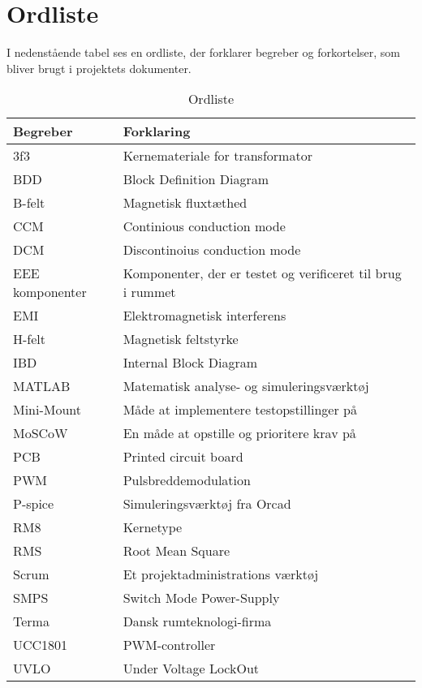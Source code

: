 \section{Ordliste}
I nedenstående tabel ses en ordliste, der forklarer begreber og forkortelser, som bliver brugt i projektets dokumenter.
\begin{table}[H] 			
	\centering
	\begin{tabularx}{\textwidth}{|X|l|} 
		\hline
		\textbf{Begreber} & \textbf{Forklaring} \\ \hline
		3f3 & Kernemateriale for transformator \\ \hline
		BDD & Block Definition Diagram \\ \hline
		B-felt & Magnetisk fluxtæthed \\ \hline
		CCM & Continious conduction mode \\ \hline
		DCM & Discontinoius conduction mode \\ \hline
		EEE komponenter & Komponenter, der er testet og verificeret til brug i rummet \\ \hline
		EMI & Elektromagnetisk interferens \\ \hline
		H-felt & Magnetisk feltstyrke \\ \hline
		IBD & Internal Block Diagram \\ \hline
		MATLAB & Matematisk analyse- og simuleringsværktøj \\ \hline
		Mini-Mount & Måde at implementere testopstillinger på \\ \hline
		MoSCoW & En måde at opstille og prioritere krav på \\ \hline
		PCB & Printed circuit board \\ \hline
		PWM & Pulsbreddemodulation \\ \hline
		P-spice & Simuleringsværktøj fra Orcad \\ \hline
		RM8 & Kernetype \\ \hline
		RMS & Root Mean Square \\ \hline
		Scrum & Et projektadministrations værktøj \\ \hline
		SMPS & Switch Mode Power-Supply \\ \hline
		Terma & Dansk rumteknologi-firma  \\ \hline
		UCC1801 & PWM-controller \\ \hline
		UVLO & Under Voltage LockOut \\ \hline
	\end{tabularx}
	
	\caption{Ordliste}
	\label{tab:ucc1801_specs}
\end{table}

